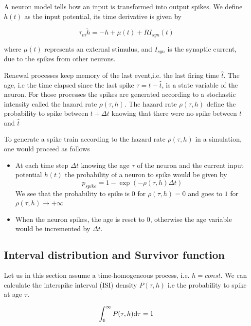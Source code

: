 \documentclass[12pt,twoside]{report}
\def \dd  {{\rm d}}
\begin{document}
A neuron model tells how an input is transformed into output spikes. We define $h(t)$ as the input potential, its time derivative is given by

\begin{equation}
\label{eq:h}
\tau_m\dot{h}=-h+\mu(t) +RI_{syn}(t)
\end{equation}

where $\mu(t)$ represents an external stimulus, and $I_{syn}$ is the synaptic current, due to the spikes from other neurons.

Renewal processes keep memory of the last event,i.e. the last firing time $\hat{t}$. The age, i.e the time elapsed since the last spike $\tau=t-\hat{t}$, is a state variable of the neuron. For those processes the spikes are generated according to a stochastic intensity called the hazard rate $\rho(\tau,h)$. The hazard rate $\rho(\tau,h)$ define the probability to spike between $t+\Delta t$ knowing that there were no spike between $t$ and $\hat{t}$

To generate a spike train according to the hazard rate $\rho(\tau,h)$ in a simulation, one would proceed as follows
\begin{itemize}
\item At each time step $\Delta t$ knowing the age $\tau$ of the neuron and the current input potential $h(t)$ the probability of a neuron to spike would be given by \begin{equation}
p_{spike}=1-\exp(-\rho(\tau,h)\Delta t)
\end{equation} We see that the probability to spike is $0$ for $\rho(\tau,h)=0$ and goes to $1$ for $\rho(\tau,h)\rightarrow +\infty$
\item When the neuron spikes, the age is reset to $0$, otherwise the age variable would be incremented by $\Delta t$. 
\end{itemize}


\subsection{Interval distribution and Survivor function}

Let us in this section assume a time-homogeneous process, i.e. $h=const$. We can calculate the interspike interval (ISI) density $P(\tau,h)$ i.e the probability to spike at age $\tau$. 

\begin{equation}
\label{eq:Pnorm}
\int_0^\infty P(\tau,h)\dd\tau=1 
\end{equation}
\end{document}
